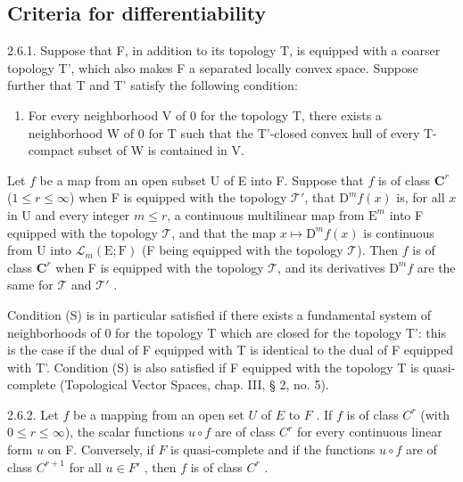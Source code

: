 \subsection{Criteria for differentiability}

2.6.1. Suppose that F, in addition to its topology T, is equipped with a coarser topology T', which also makes F a separated locally convex space. Suppose further that T and T' satisfy the following condition:

\begin{enumerate}
\def\labelenumi{(\Alph{enumi})}
\setcounter{enumi}{18}
\tightlist
\item
  For every neighborhood V of 0 for the topology T, there exists a neighborhood W of 0 for T such that the T'-closed convex hull of every T-compact subset of W is contained in V.
\end{enumerate}

Let \(f\) be a map from an open subset U of E into F. Suppose that \(f\) is of class \(\mathbf{C}^{r}\) (\(1 \leqslant r \leqslant \infty\)) when F is equipped with the topology \(\mathcal{T}'\), that \(\mathrm{D}^{m}f(x)\) is, for all \(x\) in U and every integer \(m \leqslant r\), a continuous multilinear map from \(\mathrm{E}^{m}\) into F equipped with the topology \(\mathcal{T}\), and that the map \(x \mapsto \mathrm{D}^{m}f(x)\) is continuous from U into \(\mathcal{L}_{m}(\mathrm{E};\mathrm{F})\) (F being equipped with the topology \(\mathcal{T}\)). Then \(f\) is of class \(\mathbf{C}^{r}\) when F is equipped with the topology \(\mathcal{T}\), and its derivatives \(\mathrm{D}^{m}f\) are the same for \(\mathcal{T}\) and \(\mathcal{T}'\) .

Condition (S) is in particular satisfied if there exists a fundamental system of neighborhoods of 0 for the topology T which are closed for the topology T': this is the case if the dual of F equipped with T is identical to the dual of F equipped with T'. Condition (S) is also satisfied if F equipped with the topology T is quasi-complete (Topological Vector Spaces, chap. III, § 2, no. 5).

2.6.2. Let \(f\) be a mapping from an open set \(U\) of \(E\) to \(F\) . If \(f\) is of class \(C^r\) (with \(0 \leqslant r \leqslant \infty\)), the scalar functions \(u \circ f\) are of class \(C^r\) for every continuous linear form \(u\) on F. Conversely, if \(F\) is quasi-complete and if the functions \(u \circ f\) are of class \(C^{r+1}\) for all \(u \in F'\) , then \(f\) is of class \(C^r\) .

